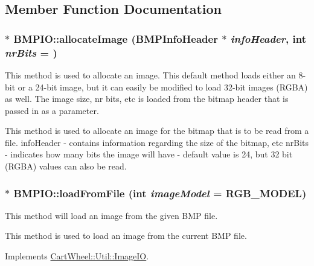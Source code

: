 \subsection{Member Function Documentation}
\hypertarget{classCartWheel_1_1Util_1_1BMPIO_ada79536ad8a3d1930b0b881efabc159b}{
\subsubsection[{allocateImage}]{ $\ast$ BMPIO::allocateImage ({\bf BMPInfoHeader} $\ast$ {\em infoHeader}, \/  int {\em nrBits} = {})}}
\label{classCartWheel_1_1Util_1_1BMPIO_ada79536ad8a3d1930b0b881efabc159b}
This method is used to allocate an image. This default method loads either an 8-\/bit or a 24-\/bit image, but it can easily be modified to load 32-\/bit images (RGBA) as well. The image size, nr bits, etc is loaded from the bitmap header that is passed in as a parameter.

This method is used to allocate an image for the bitmap that is to be read from a file. infoHeader -\/ contains information regarding the size of the bitmap, etc nrBits -\/ indicates how many bits the image will have -\/ default value is 24, but 32 bit (RGBA) values can also be read. \hypertarget{classCartWheel_1_1Util_1_1BMPIO_a1dd8a7208f86e519a8446c1e2eb55f51}{
\subsubsection[{loadFromFile}]{ $\ast$ BMPIO::loadFromFile (int {\em imageModel} = {\ttfamily RGB\_\-MODEL})}}
\label{classCartWheel_1_1Util_1_1BMPIO_a1dd8a7208f86e519a8446c1e2eb55f51}
This method will load an image from the given BMP file.

This method is used to load an image from the current BMP file. 

Implements \hyperlink{classCartWheel_1_1Util_1_1ImageIO_a49fb3a4d44a8cabeb66ca06eca15879f}{CartWheel::Util::ImageIO}.


